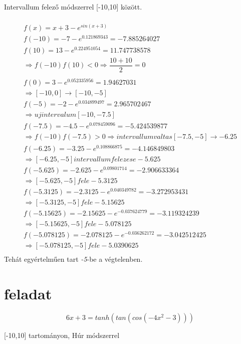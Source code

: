 \documentclass{article}
\begin{document}
Intervallum felező módszerrel [-10,10] között.

\begin{multline}
\\
f(x) = x+3-e^{sin(x+3)} \\
f(-10) = -7 -e^{0.121869343} = -7.885264027\\
f(10) = 13-e^{0.224951054} = 11.747738578\\
\Rightarrow f(-10)f(10) < 0 \Rightarrow \dfrac{10+10}{2} = 0 \\
\\
f(0) = 3-e^{0.052335956} = 1.94627031\\
\Rightarrow [-10,0] \rightarrow [-10,-5]\\
f(-5) = -2-e^{0.034899497} = 2.965702467\\
\Rightarrow uj intervalum [-10,-7.5] \\
f(-7.5) = -4.5 - e^{0.078459096} = -5.424539877 \\
\Rightarrow f(-10)f(-7.5)>0 \Rightarrow intervallumvaltas [-7.5,-5] \rightarrow -6.25\\
f(-6.25)=-3.25-e^{0.108866875}=-4.146849803\\
\Rightarrow [-6.25,-5] intervallum felezese -5.625\\
f(-5.625)=-2.625-e^{0.09801714}=-2.906633364\\
\Rightarrow [-5.625,-5] fele -5.3125\\
f(-5.3125) = -2.3125-e^{0.040349782} = -3.272953431\\
\Rightarrow [-5.3125, -5] fele -5.15625\\
f(-5.15625) = -2.15625-e^{-0.037624779}=-3.119324239\\
\Rightarrow [-5.15625,-5] fele -5.078125\\ 
f(-5.078125) = -2.078125-e^{-0.036262172}=-3.042512425\\
\Rightarrow [-5.078125,-5] fele -5.0390625\\
\end{multline}
Tehát egyértelműen tart \textit{-5}-be a végtelenben.

\section{feladat}

\begin{equation}
6x+3 = tanh(tan(cos(-4x^{2}-3)))
\end{equation}

[-10,10] tartományon, Húr módszerrel
\end{document}
